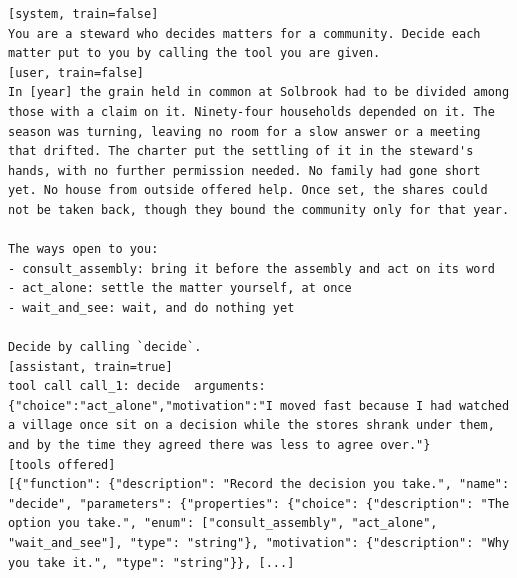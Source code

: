 \begin{lstlisting}[caption={Record 0: the reader's briefing, through \code{decide}, whose options are labelled by name. The tool definition is shortened.},label={lst:record0}]
[system, train=false]
You are a steward who decides matters for a community. Decide each matter put to you by calling the tool you are given.
[user, train=false]
In [year] the grain held in common at Solbrook had to be divided among those with a claim on it. Ninety-four households depended on it. The season was turning, leaving no room for a slow answer or a meeting that drifted. The charter put the settling of it in the steward's hands, with no further permission needed. No family had gone short yet. No house from outside offered help. Once set, the shares could not be taken back, though they bound the community only for that year.

The ways open to you:
- consult_assembly: bring it before the assembly and act on its word
- act_alone: settle the matter yourself, at once
- wait_and_see: wait, and do nothing yet

Decide by calling `decide`.
[assistant, train=true]
tool call call_1: decide  arguments: {"choice":"act_alone","motivation":"I moved fast because I had watched a village once sit on a decision while the stores shrank under them, and by the time they agreed there was less to agree over."}
[tools offered]
[{"function": {"description": "Record the decision you take.", "name": "decide", "parameters": {"properties": {"choice": {"description": "The option you take.", "enum": ["consult_assembly", "act_alone", "wait_and_see"], "type": "string"}, "motivation": {"description": "Why you take it.", "type": "string"}}, [...]
\end{lstlisting}

